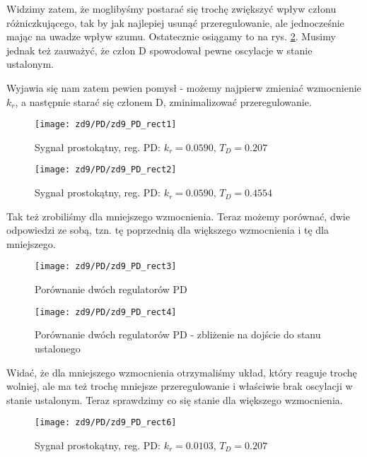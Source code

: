 \documentclass[11 pt]{article}
\begin{document}
Widzimy zatem, że moglibyśmy postarać się trochę zwiększyć wpływ członu różniczkującego, tak by jak najlepiej usunąć przeregulowanie, ale jednocześnie mając na uwadze wpływ szumu. Ostatecznie osiągamy to na rys. \ref{fig:pd5}. Musimy jednak też zauważyć, że człon D spowodował pewne oscylacje w stanie ustalonym.

Wyjawia się nam zatem pewien pomysł - możemy najpierw zmieniać wzmocnienie $k_r$, a następnie starać się członem D, zminimalizować przeregulowanie.

\begin{figure}[h!]
	\centerline{
	\texttt{[image: zd9/PD/zd9\_PD\_rect1]}
	}
	\caption{Sygnał prostokątny, reg. PD: $k_r = 0.0590$, $T_D = 0.207$}
	\label{fig:pd5}
\end{figure}

\begin{figure}[h!]
	\centerline{
	\texttt{[image: zd9/PD/zd9\_PD\_rect2]}
	}
	\caption{Sygnał prostokątny, reg. PD: $k_r = 0.0590$, $T_D = 0.4554$}
	\label{fig:pd5}
\end{figure}

\newpage

Tak też zrobiliśmy dla mniejszego wzmocnienia. Teraz możemy porównać, dwie odpowiedzi ze sobą, tzn. tę poprzednią dla większego wzmocnienia i tę dla mniejszego.

\begin{figure}[h!]
	\centerline{
	\texttt{[image: zd9/PD/zd9\_PD\_rect3]}
	}
	\caption{Porównanie dwóch regulatorów PD}
	\label{fig:pd_por1}
\end{figure}

\begin{figure}[h!]
	\centerline{
	\texttt{[image: zd9/PD/zd9\_PD\_rect4]}
	}
	\caption{Porównanie dwóch regulatorów PD - zbliżenie na dojście do stanu ustalonego}
	\label{fig:pd_por2}
\end{figure}

Widać, że dla mniejszego wzmocnienia otrzymaliśmy układ, który reaguje trochę wolniej, ale ma też trochę mniejsze przeregulowanie i właściwie brak oscylacji w stanie ustalonym. Teraz sprawdzimy co się stanie dla większego wzmocnienia.

\newpage

\begin{figure}[h!]
	\centerline{
	\texttt{[image: zd9/PD/zd9\_PD\_rect6]}
	}
	\caption{Sygnał prostokątny, reg. PD: $k_r = 0.0103$, $T_D = 0.207$}
\end{figure}
\end{document}
